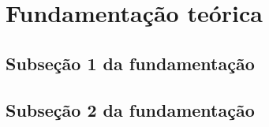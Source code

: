 \section{Fundamentação teórica}
\label{sec:fundamentacao}

\lipsum[1]

\subsection{Subseção 1 da fundamentação}

\lipsum[2]

\subsection{Subseção 2 da fundamentação}

\lipsum[3]
